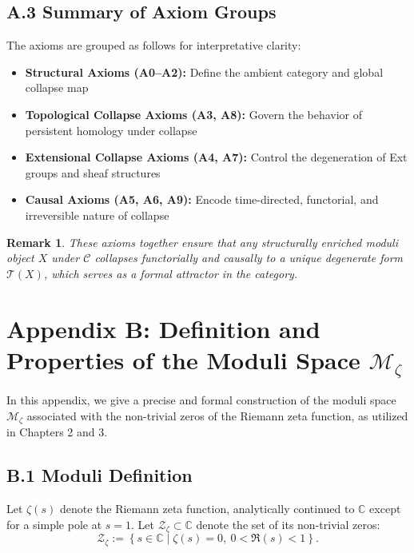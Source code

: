\documentclass[11pt]{article}
\newtheorem{remark}[theorem]{Remark}
\begin{document}
\subsection*{A.3 Summary of Axiom Groups}

The axioms are grouped as follows for interpretative clarity:

\begin{itemize}
    \item \textbf{Structural Axioms (A0–A2):} Define the ambient category and global collapse map
    \item \textbf{Topological Collapse Axioms (A3, A8):} Govern the behavior of persistent homology under collapse
    \item \textbf{Extensional Collapse Axioms (A4, A7):} Control the degeneration of Ext groups and sheaf structures
    \item \textbf{Causal Axioms (A5, A6, A9):} Encode time-directed, functorial, and irreversible nature of collapse
\end{itemize}

\begin{remark}
These axioms together ensure that any structurally enriched moduli object $X$ under $\mathcal{C}$  
collapses functorially and causally to a unique degenerate form $\mathcal{T}(X)$,  
which serves as a formal attractor in the category.
\end{remark}



\section*{Appendix B: Definition and Properties of the Moduli Space $\mathcal{M}_\zeta$}

In this appendix, we give a precise and formal construction of the moduli space $\mathcal{M}_\zeta$  
associated with the non-trivial zeros of the Riemann zeta function, as utilized in Chapters 2 and 3.

\subsection*{B.1 Moduli Definition}

Let $\zeta(s)$ denote the Riemann zeta function, analytically continued to $\mathbb{C}$ except for a simple pole at $s = 1$.  
Let $\mathcal{Z}_\zeta \subset \mathbb{C}$ denote the set of its non-trivial zeros:
\[
\mathcal{Z}_\zeta := \left\{ s \in \mathbb{C} \mid \zeta(s) = 0,\ 0 < \Re(s) < 1 \right\}.
\]
\end{document}
